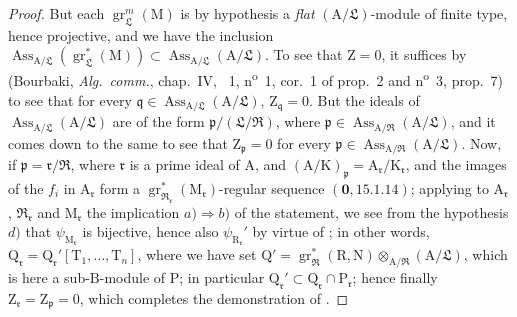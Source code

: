 \begin{proof}
But each $\operatorname{gr}_\mathfrak{L}^m(\mathrm{M})$ is by hypothesis a \emph{flat} $(\mathrm{A}/\mathfrak{L})$-module of finite type, hence projective, and we have the inclusion $\operatorname{Ass}_{\mathrm{A}/\mathfrak{L}}(\operatorname{gr}_\mathfrak{L}^*(\mathrm{M}))\subset\operatorname{Ass}_{\mathrm{A}/\mathfrak{L}}(\mathrm{A}/\mathfrak{L})$. To see that $\mathrm{Z}=0$, it suffices by (Bourbaki, \emph{Alg.~comm.}, chap.~IV, \textsection~1, n\textsuperscript{o}~1, cor.~1 of prop.~2 and n\textsuperscript{o}~3, prop.~7) to see that for every $\mathfrak{q}\in\operatorname{Ass}_{\mathrm{A}/\mathfrak{L}}(\mathrm{A}/\mathfrak{L})$, $\mathrm{Z}_\mathfrak{q}=0$. But the ideals of $\operatorname{Ass}_{\mathrm{A}/\mathfrak{L}}(\mathrm{A}/\mathfrak{L})$ are of the form $\mathfrak{p}/(\mathfrak{L}/\mathfrak{R})$, where $\mathfrak{p}\in\operatorname{Ass}_{\mathrm{A}/\mathfrak{R}}(\mathrm{A}/\mathfrak{L})$, and it comes down to the same to see that $\mathrm{Z}_\mathfrak{p}=0$ for every $\mathfrak{p}\in\operatorname{Ass}_{\mathrm{A}/\mathfrak{R}}(\mathrm{A}/\mathfrak{L})$. Now, if $\mathfrak{p}=\mathfrak{r}/\mathfrak{R}$, where $\mathfrak{r}$ is a prime ideal of $\mathrm{A}$, and $(\mathrm{A}/\mathrm{K})_\mathfrak{p}=\mathrm{A}_\mathfrak{r}/\mathrm{K}_\mathfrak{r}$, and the images of the $f_i$ in $\mathrm{A}_\mathfrak{r}$ form a $\operatorname{gr}_{\mathfrak{R}_\mathfrak{r}}^*(\mathrm{M}_\mathfrak{r})$-regular sequence $(\mathbf{0},15.1.14)$; applying to $\mathrm{A}_\mathfrak{r}$, $\mathfrak{R}_\mathfrak{r}$ and $\mathrm{M}_\mathfrak{r}$ the implication $a)\Rightarrow b)$ of the statement, we see from the hypothesis $d)$ that $\psi_{\mathrm{M}_\mathfrak{r}}$ is bijective, hence also $\psi_{\mathrm{R}_\mathfrak{r}}'$ by virtue of ; in other words, $\mathrm{Q}_\mathfrak{r}=\mathrm{Q}_\mathfrak{r}'[\mathrm{T}_1,\ldots,\mathrm{T}_n]$, where we have set $\mathrm{Q}'=\operatorname{gr}_\mathfrak{R}^*(\mathrm{R},\mathrm{N})\otimes_{\mathrm{A}/\mathfrak{R}}(\mathrm{A}/\mathfrak{L})$, which is here a sub-$\mathrm{B}$-module of $\mathrm{P}$; in particular $\mathrm{Q}_\mathfrak{r}'\subset\mathrm{Q}_\mathfrak{r}\cap\mathrm{P}_\mathfrak{r}$; hence finally $\mathrm{Z}_\mathfrak{r}=\mathrm{Z}_\mathfrak{p}=0$, which completes the demonstration of .


\end{proof}
